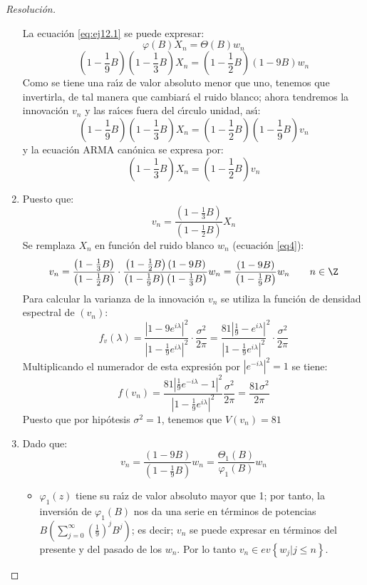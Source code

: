 \begin{ejemplo}
\begin{proof}[Resoluci\'{o}n]
\begin{enumerate}
La ecuaci\'{o}n \eqref{eq:ej12.1} se puede expresar:
\[
\varphi (B) X_{n} =\Theta (B)w_{n} 
\]
\begin{equation}
\label{eq4}
\left( {1-\frac{1}{9}B} \right) \left( {1-\frac{1}{3}B} \right) X_{n} 
=\left( {1-\frac{1}{2}B} \right)\left( {1-9B} \right) w_{n} 
\end{equation}
Como se tiene una ra\'{\i}z de valor absoluto menor que uno, tenemos que 
invertirla, de tal manera que cambiar\'{a} el ruido blanco; ahora tendremos 
la innovaci\'{o}n $v_{n}$ y las ra\'{\i}ces fuera del c\'{\i}rculo unidad, 
as\'{\i}:
\[
\left( {1-\frac{1}{9}B} \right)\left( {1-\frac{1}{3}B} \right) X_{n} 
=\left( {1-\frac{1}{2}B} \right) \left( {1-\frac{1}{9}B} \right)v_{n} 
\]
y la ecuaci\'{o}n ARMA can\'{o}nica se expresa por:
\[
\left( {1-\frac{1}{3}B} \right)X_{n} =\left( {1-\frac{1}{2}B} 
\right)v_{n} 
\]

\item Puesto que:
\[
v_{n} =\frac{\left( {1-\frac{1}{3}B} \right)}{\left( {1-\frac{1}{2}B} 
\right)}X_{n} 
\]
Se remplaza $X_{{n}}$ en funci\'{o}n del ruido blanco $w_{n}$ (ecuaci\'{o}n \eqref{eq4}):
\[
v_{n} =\frac{\left( {1-\frac{1}{3}B} \right)}{\left( {1-\frac{1}{2}B} 
\right)}\cdot \frac{\left( {1-\frac{1}{2}B} \right)\left( {1-9B} 
\right)}{\left( {1-\frac{1}{9}B} \right)\left( {1-\frac{1}{3}B} 
\right)}w_{n} 
=\frac{\left( {1-9B} \right)}{\left( {1-\frac{1}{9}B} \right)}w_{n} \qquad n\in \Z
\]
Para calcular la varianza de la innovaci\'{o}n $v_{n}$ se utiliza la 
funci\'{o}n de densidad espectral de $(v_{n})$:
\[
f_{v} (\lambda )=\frac{\left| {1-9 e^{i\lambda } } \right|^{2}}{\left| 
{1-\frac{1}{9} e^{i\lambda }} \right|^{2}}\cdot \frac{\sigma^{2}}{2\pi 
}=\frac{81\left| {\frac{1}{9}-e^{i\lambda }} \right|}{\left| 
{1-\frac{1}{9}e^{i\lambda }} \right|^{2}}^{2}\cdot \frac{\sigma^{2}}{2\pi }
\]
Multiplicando el numerador de esta expresi\'{o}n por $\left| {e^{-i\lambda 
}} \right|^{2}=1$ se tiene:
\[
f (v_{n} )=\frac{81\left| {\frac{1}{9}e^{-i\lambda }-1} \right|^{2}}{\left| 
{1-\frac{1}{9}e^{i\lambda }} \right|^{2}}\frac{\sigma^{2}}{2\pi }=
\frac{81\sigma^{2}}{2\pi }
\]
Puesto que por hip\'{o}tesis $\sigma^{2}=1$, tenemos que $V(v_{n})=81$ 

\item Dado que:
\[
 v_{n}=\frac{\left( {1-9B} \right) }{\left( {1-\frac{1}{9}B} 
\right)}w_{n} =\frac{\Theta_{1}  (B)}{\varphi_{1}  (B)}w_{n} 
\]
\begin{itemize}
\item $\varphi_{1}  (z)$ tiene su ra\'{\i}z de valor absoluto mayor que 1; por tanto, la inversi\'{o}n de $\varphi_{1} (B)$ nos da una serie en t\'{e}rminos de potencias $B\left( {\sum_{j=0}^\infty {\left( {\frac{1}{9}} \right)^{j}B^{j}} } \right)$; es decir; $v_{n} $ se puede expresar en t\'{e}rminos del presente y del pasado de los $w_{n}$. Por lo tanto $v_{n }\in   ev\left\{ {w_{j} \left| {j\le n} \right.} \right\}$.


\end{itemize}
\end{enumerate}
\end{proof}
\end{ejemplo}

